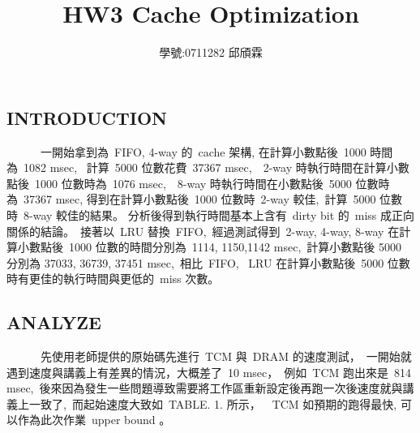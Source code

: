\documentclass{article}
\title{\textbf{\LARGE {HW3 Cache Optimization}}}
\author{學號:0711282 邱頎霖}
\date{}
\begin{document}
\begin{CJK*}{UTF8}{bsmi}
\setlength{\columnsep}{1cm}

\vspace*{-50pt}
    {\let\newpage\relax\maketitle}

\begin{multicols}{2}

\begin{center}
    \section*{INTRODUCTION}
\end{center}

\begin{flushleft}
    \ \ \ \ \ \ 一開始拿到為\ FIFO, 4-way 的\ cache 架構, 在計算小數點後\ 1000 時間為\ 1082 msec, \
    計算\ 5000 位數花費\ 37367 msec,\
    \ 2-way 時執行時間在計算小數點後\ 1000 位數時為\ 1076 msec,\
    \ 8-way 時執行時間在小數點後\ 5000 位數時為\ 37367 msec,
    得到在計算小數點後\ 1000 位數時\ 2-way 較佳,\
    計算\ 5000 位數時\ 8-way 較佳的結果。
    分析後得到執行時間基本上含有\ dirty bit 的\ miss 成正向關係的結論。\
    接著以\ LRU 替換\ FIFO,\
    經過測試得到\ 2-way, 4-way, 8-way 在計算小數點後\ 1000 位數的時間分別為\ 1114, 1150,1142 msec,\
    計算小數點後 5000 分別為 37033, 36739, 37451 msec,\
    相比\ FIFO, \ LRU 在計算小數點後\ 5000 位數時有更佳的執行時間與更低的\ miss 次數。\newline
\end{flushleft}

\begin{center}
    \section*{ANALYZE}
\end{center}

\begin{flushleft}
    \ \ \ \ \ \ 先使用老師提供的原始碼先進行\ TCM 與\ DRAM 的速度測試，\
    一開始就遇到速度與講義上有差異的情況，大概差了\ 10 msec，\
    例如\ TCM 跑出來是\ 814 msec,\
    後來因為發生一些問題導致需要將工作區重新設定後再跑一次後速度就與講義上一致了,\
    而起始速度大致如\ TABLE. 1. 所示，\
    \ TCM 如預期的跑得最快, 可以作為此次作業\ upper bound 。\
\end{flushleft}


\end{multicols}
\end{CJK*}
\end{document}
